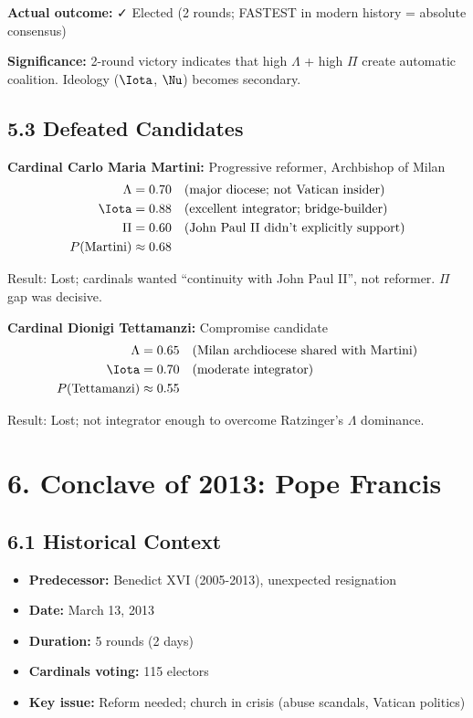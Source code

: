 \textbf{Actual outcome:} ✓ Elected (2 rounds; FASTEST in modern history = absolute consensus)

\textbf{Significance:} 2-round victory indicates that high $\Lambda$ + high $\Pi$ create automatic coalition. Ideology ($\Iota$, $\Nu$) becomes secondary.

\subsection{5.3 Defeated Candidates}

\textbf{Cardinal Carlo Maria Martini:} Progressive reformer, Archbishop of Milan
\begin{align*}
\Lambda &= 0.70 \quad \text{(major diocese; not Vatican insider)} \\
\Iota &= 0.88 \quad \text{(excellent integrator; bridge-builder)} \\
\Pi &= 0.60 \quad \text{(John Paul II didn't explicitly support)} \\
P(\text{Martini}) &\approx 0.68
\end{align*}

Result: Lost; cardinals wanted ``continuity with John Paul II'', not reformer. $\Pi$ gap was decisive.

\textbf{Cardinal Dionigi Tettamanzi:} Compromise candidate
\begin{align*}
\Lambda &= 0.65 \quad \text{(Milan archdiocese shared with Martini)} \\
\Iota &= 0.70 \quad \text{(moderate integrator)} \\
P(\text{Tettamanzi}) &\approx 0.55
\end{align*}

Result: Lost; not integrator enough to overcome Ratzinger's $\Lambda$ dominance.

\section{6. Conclave of 2013: Pope Francis}

\subsection{6.1 Historical Context}

\begin{itemize}
\item \textbf{Predecessor:} Benedict XVI (2005-2013), unexpected resignation
\item \textbf{Date:} March 13, 2013
\item \textbf{Duration:} 5 rounds (2 days)
\item \textbf{Cardinals voting:} 115 electors
\item \textbf{Key issue:} Reform needed; church in crisis (abuse scandals, Vatican politics)
\end{itemize}

